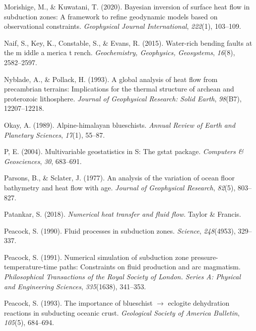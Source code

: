 \begin{CSLReferences}{1}{1}
\leavevmode{}%
Morishige, M., \& Kuwatani, T. (2020). Bayesian inversion of surface heat flow in subduction zones: A framework to refine geodynamic models based on observational constraints. \emph{Geophysical Journal International}, \emph{222}(1), 103--109.

\leavevmode{}%
Naif, S., Key, K., Constable, S., \& Evans, R. (2015). Water-rich bending faults at the m iddle a merica t rench. \emph{Geochemistry, Geophysics, Geosystems}, \emph{16}(8), 2582--2597.

\leavevmode{}%
Nyblade, A., \& Pollack, H. (1993). A global analysis of heat flow from precambrian terrains: Implications for the thermal structure of archean and proterozoic lithosphere. \emph{Journal of Geophysical Research: Solid Earth}, \emph{98}(B7), 12207--12218.

\leavevmode{}%
Okay, A. (1989). Alpine-himalayan blueschists. \emph{Annual Review of Earth and Planetary Sciences}, \emph{17}(1), 55--87.

\leavevmode{}%
P, E. (2004). Multivariable geostatistics in {S}: The gstat package. \emph{Computers \& Geosciences}, \emph{30}, 683--691.

\leavevmode{}%
Parsons, B., \& Sclater, J. (1977). An analysis of the variation of ocean floor bathymetry and heat flow with age. \emph{Journal of Geophysical Research}, \emph{82}(5), 803--827.

\leavevmode{}%
Patankar, S. (2018). \emph{Numerical heat transfer and fluid flow}. Taylor \& Francis.

\leavevmode{}%
Peacock, S. (1990). Fluid processes in subduction zones. \emph{Science}, \emph{248}(4953), 329--337.

\leavevmode{}%
Peacock, S. (1991). Numerical simulation of subduction zone pressure-temperature-time paths: Constraints on fluid production and arc magmatism. \emph{Philosophical Transactions of the Royal Society of London. Series A: Physical and Engineering Sciences}, \emph{335}(1638), 341--353.

\leavevmode{}%
Peacock, S. (1993). The importance of blueschist \(\rightarrow\) eclogite dehydration reactions in subducting oceanic crust. \emph{Geological Society of America Bulletin}, \emph{105}(5), 684--694.


\end{CSLReferences}
